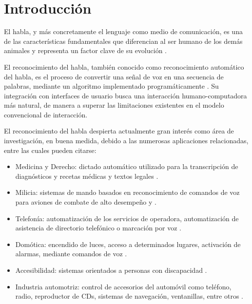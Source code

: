 \section{Introducci\'{o}n}
\label{sec:intro}

El habla, y m\'{a}s concretamente el lenguaje como medio de comunicaci\'{o}n, es una de las 
caracter\'{i}sticas fundamentales 
que diferencian al ser humano de los dem\'{a}s animales y representa un factor clave de su evoluci\'{o}n \cite{SchepartzLanguage1993}. 

El reconocimiento del habla, tambi\'{e}n conocido como reconocimiento autom\'{a}tico del habla,
es el proceso de convertir
una se\~{n}al de voz en una secuencia de palabras, mediante un algoritmo implementado 
programáticamente \cite{JaisalAReview2012}. Su integraci\'{o}n con interfaces de usuario busca una interacci\'{o}n 
humano-computadora m\'{a}s natural, de manera a superar las limitaciones existentes 
en el modelo convencional de interacci\'{o}n.

El reconocimiento del habla despierta actualmente gran inter\'{e}s como \'{a}rea de investigaci\'{o}n, 
en buena medida, debido a las numerosas aplicaciones relacionadas, entre las cuales pueden citarse:

\begin{itemize}
    \item Medicina y Derecho: dictado autom\'{a}tico utilizado para la transcripci\'{o}n de 
     diagn\'{o}sticos y recetas m\'{e}dicas y textos legales \cite{GrassoTheLong2003}.

    \item Milicia: sistemas de mando basados en reconocimiento de comandos de voz para aviones 
     de combate de alto desempe\~{n}o \cite{Eurofighter} y \cite{WeinsteinOpportunities1991}.

    \item Telefon\'{i}a: automatizaci\'{o}n de los servicios de operadora, automatizaci\'{o}n de 
     asistencia de directorio telef\'{o}nico o marcaci\'{o}n por voz \cite{RabinerAutomatic1997}.

    \item Dom\'{o}tica: encendido de luces, acceso a determinados lugares, activaci\'{o}n de alarmas, 
     mediante comandos de voz \cite{BellesiReconocimiento2008}.

    \item Accesibilidad: sistemas orientados a personas con discapacidad \cite{MirandaUnJuego2007}.

    \item Industria automotriz: control de accesorios del autom\'{o}vil como tel\'{e}fono, radio, 
     reproductor de CDs, sistemas de navegaci\'{o}n, ventanillas, entre otros \cite{SalaSpeech1999}.
\end{itemize}


